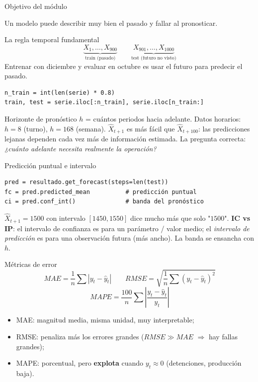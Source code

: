 



\begin{frame}{Objetivo del módulo}

Un modelo puede describir muy bien el pasado y fallar al pronosticar.
\end{frame}

\begin{frame}[fragile]{La regla temporal fundamental}
\[
\underbrace{X_1,\dots,X_{900}}_{\text{train (pasado)}}\qquad
\underbrace{X_{901},\dots,X_{1000}}_{\text{test (futuro no visto)}}
\]
 Entrenar con diciembre y evaluar
en octubre es usar el futuro para predecir el pasado.
\begin{lstlisting}
n_train = int(len(serie) * 0.8)
train, test = serie.iloc[:n_train], serie.iloc[n_train:]
\end{lstlisting}
\end{frame}

\begin{frame}{Horizonte de pronóstico}
$h$ = cuántos periodos hacia adelante. Datos horarios: $h=8$ (turno), $h=168$ (semana).
\vfill
{}
$\hat X_{t+1}$ es más fácil que $\hat X_{t+100}$: las predicciones lejanas dependen cada
vez más de información estimada. La pregunta correcta: \emph{¿cuánto adelante necesita
realmente la operación?}
\end{frame}

\begin{frame}[fragile]{Predicción puntual e intervalo}
\begin{lstlisting}
pred = resultado.get_forecast(steps=len(test))
fc = pred.predicted_mean          # predicción puntual
ci = pred.conf_int()              # banda del pronóstico
\end{lstlisting}
$\hat X_{t+1}=1500$ con intervalo $[1450,1550]$ dice mucho más que solo "$1500$".
\vfill
\textbf{IC vs IP}: el intervalo de confianza es para un parámetro / valor medio;
el \emph{intervalo de predicción} es para una observación futura (más ancho).
La banda se ensancha con $h$.
\end{frame}

\begin{frame}{Métricas de error}
\[
MAE=\frac{1}{n}\sum|y_t-\hat y_t|
\qquad
RMSE=\sqrt{\frac{1}{n}\sum (y_t-\hat y_t)^2}
\]
\[
MAPE=\frac{100}{n}\sum\left|\frac{y_t-\hat y_t}{y_t}\right|
\]
\begin{itemize}
  \item MAE: magnitud media, misma unidad, muy interpretable;
  \item RMSE: penaliza más los errores grandes ($RMSE\gg MAE$ $\Rightarrow$ hay fallas grandes);
  \item MAPE: porcentual, pero \textbf{explota} cuando $y_t\approx0$ (detenciones, producción baja).
\end{itemize}
\end{frame}

